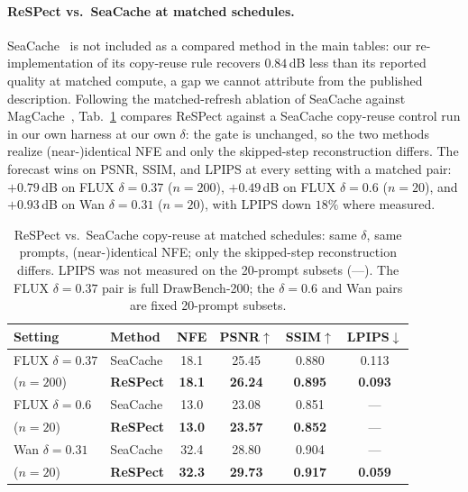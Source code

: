 \paragraph{ReSPect vs.\ SeaCache at matched schedules.}
SeaCache~\citep{seacache} is not included as a compared method in the
main tables: our re-implementation of its copy-reuse rule recovers
$0.84$\,dB less than its reported quality at matched compute, a gap we
cannot attribute from the published description. Following the
matched-refresh ablation of SeaCache against
MagCache~\citep{seacache}, Tab.~\ref{tab:abl-sea} compares ReSPect
against a SeaCache copy-reuse control run in our own harness at our own
$\delta$: the gate is unchanged, so the two methods realize
(near-)identical NFE and only the skipped-step reconstruction differs.
The forecast wins on PSNR, SSIM, and LPIPS at every setting with a
matched pair: $+0.79$\,dB on FLUX $\delta{=}0.37$ ($n{=}200$),
$+0.49$\,dB on FLUX $\delta{=}0.6$ ($n{=}20$), and $+0.93$\,dB on Wan
$\delta{=}0.31$ ($n{=}20$), with LPIPS down $18\%$ where measured.

\begin{table}[h]
  \centering
  \caption{ReSPect vs.\ SeaCache copy-reuse at matched schedules: same
  $\delta$, same prompts, (near-)identical NFE; only the skipped-step
  reconstruction differs. LPIPS was not measured on the 20-prompt
  subsets (---). The FLUX $\delta{=}0.37$ pair is full DrawBench-200;
  the $\delta{=}0.6$ and Wan pairs are fixed 20-prompt subsets.}
  \label{tab:abl-sea}
  \vspace{0.1cm}
  {\scriptsize\setlength{\tabcolsep}{4pt}
  \begin{tabular}{llcccc}
    \toprule
    Setting & Method & NFE & PSNR$\uparrow$ & SSIM$\uparrow$ & LPIPS$\downarrow$ \\
    \midrule
    FLUX $\delta{=}0.37$ & SeaCache & 18.1 & 25.45 & 0.880 & 0.113 \\
    ($n{=}200$) & \textbf{ReSPect} & \textbf{18.1} & \textbf{26.24} & \textbf{0.895} & \textbf{0.093} \\
    \midrule
    FLUX $\delta{=}0.6$ & SeaCache & 13.0 & 23.08 & 0.851 & --- \\
    ($n{=}20$) & \textbf{ReSPect} & \textbf{13.0} & \textbf{23.57} & \textbf{0.852} & --- \\
    \midrule
    Wan $\delta{=}0.31$ & SeaCache & 32.4 & 28.80 & 0.904 & --- \\
    ($n{=}20$) & \textbf{ReSPect} & \textbf{32.3} & \textbf{29.73} & \textbf{0.917} & \textbf{0.059} \\
    \bottomrule
  \end{tabular}}
\end{table}

